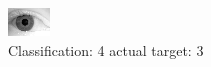 \begin{figure}[h!]
\begin{center}
\includegraphics[width=0.60\columnwidth]{figures/ID2212_class_4_target_3.png}
\end{center}
\caption{ Classification: 4 actual target: 3}
\label{fig:ID2212_class_4_target_3}
\end{figure}
